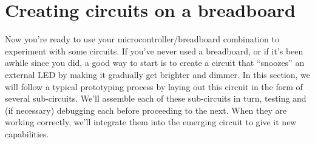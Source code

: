 \section{Creating circuits on a breadboard}
Now you're ready to use your microcontroller/breadboard combination to experiment with some circuits. 
If you've never used a breadboard, or if it’s been awhile since you did, a good way to start is to create a circuit that ``snoozes'' an external LED by making it gradually get brighter and dimmer.
In this section, we will follow a typical prototyping process by laying out this circuit in the form of several sub-circuits. 
We'll assemble each of these sub-circuits in turn, testing and (if necessary) debugging each before proceeding to the next. 
When they are working correctly, we'll integrate them into the emerging circuit to give it new capabilities.  

